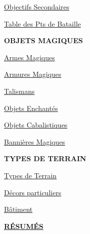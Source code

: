 \begin{framed}
\begin{multicols}{3}
\vspace*{5pt}
{\setlength\parskip{0pt}
\hyperlink{secondaryobjectives}{Objectifs Secondaires}\hfill\pageref{secondary_objectives}

\hyperlink{victorypointstable}{Table des Pts de Bataille}\hfill\pageref{victory_points_table}}

\vspace*{\fill}
\columnbreak

\begin{center}\textbf{OBJETS MAGIQUES}\end{center}

\vspace*{5pt}
{\setlength\parskip{0pt}
\hyperlink{magicalweapons}{Armes Magiques}\hfill\pageref{magical_weapons}

\hyperlink{magicalarmour}{Armures Magiques}\hfill\pageref{magical_armour}

\hyperlink{talismans}{Talismans}\hfill\pageref{talismans}

\hyperlink{enchanteditems}{Objets Enchantés}\hfill\pageref{enchanted_items}

\hyperlink{arcaneitems}{Objets Cabalistiques}\hfill\pageref{arcane_items}

\hyperlink{magicalstandards}{Bannières Magiques}\hfill\pageref{magical_standards}}

\vspace*{5pt}
\begin{center}\textbf{TYPES DE TERRAIN}\end{center}

\vspace*{5pt}
{\setlength\parskip{0pt}
\hyperlink{terraintypes}{Types de Terrain}\hfill\pageref{terrain_types}

\hyperlink{terrainfeatures}{Décors particuliers}\hfill\pageref{terrain_features}

\hyperlink{buildings}{Bâtiment}\hfill\pageref{buildings}}

\vspace*{\fill}

\begin{center}\hyperlink{summaries}{\textbf{RÉSUMÉS}}\end{center}

\end{multicols}
\setlength\columnseprule{0pt}
\vspace*{-10pt}
\end{framed}

\vspace*{20pt}
\begin{center}\end{center}
\vspace*{10pt}

